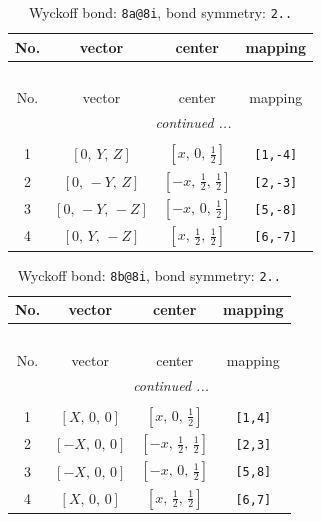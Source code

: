 \documentclass[fleqn,8pt]{jsarticle}
\begin{document}
\begin{longtable}{cccc}
\caption{Wyckoff bond: {\tt 8a@8i}, bond symmetry: {\tt 2..}}
 \\
 \hline \hline
No. & vector & center & mapping \\ \hline \endfirsthead

\multicolumn{3}{l}{\tablename\ \thetable{}} \\
 \hline \hline
No. & vector & center & mapping \\ \hline \endhead

 \hline \hline
\multicolumn{3}{r}{\footnotesize\it continued ...} \\ \endfoot

 \hline \hline
\multicolumn{3}{r}{} \\ \endlastfoot

1 & $\left[ 0,\, Y,\, Z \right]$ & $\left[ x,\, 0,\, \frac{1}{2} \right]$ & {\tt [1,-4]} \\ \hline
2 & $\left[ 0,\, - Y,\, Z \right]$ & $\left[ - x,\, \frac{1}{2},\, \frac{1}{2} \right]$ & {\tt [2,-3]} \\ \hline
3 & $\left[ 0,\, - Y,\, - Z \right]$ & $\left[ - x,\, 0,\, \frac{1}{2} \right]$ & {\tt [5,-8]} \\ \hline
4 & $\left[ 0,\, Y,\, - Z \right]$ & $\left[ x,\, \frac{1}{2},\, \frac{1}{2} \right]$ & {\tt [6,-7]} \\
\end{longtable}
\renewcommand{\arraystretch}{1.2}
\begin{longtable}{cccc}
\caption{Wyckoff bond: {\tt 8b@8i}, bond symmetry: {\tt 2..}}
 \\
 \hline \hline
No. & vector & center & mapping \\ \hline \endfirsthead

\multicolumn{3}{l}{\tablename\ \thetable{}} \\
 \hline \hline
No. & vector & center & mapping \\ \hline \endhead

 \hline \hline
\multicolumn{3}{r}{\footnotesize\it continued ...} \\ \endfoot

 \hline \hline
\multicolumn{3}{r}{} \\ \endlastfoot

1 & $\left[ X,\, 0,\, 0 \right]$ & $\left[ x,\, 0,\, \frac{1}{2} \right]$ & {\tt [1,4]} \\ \hline
2 & $\left[ - X,\, 0,\, 0 \right]$ & $\left[ - x,\, \frac{1}{2},\, \frac{1}{2} \right]$ & {\tt [2,3]} \\ \hline
3 & $\left[ - X,\, 0,\, 0 \right]$ & $\left[ - x,\, 0,\, \frac{1}{2} \right]$ & {\tt [5,8]} \\ \hline
4 & $\left[ X,\, 0,\, 0 \right]$ & $\left[ x,\, \frac{1}{2},\, \frac{1}{2} \right]$ & {\tt [6,7]} \\
\end{longtable}
\end{document}
